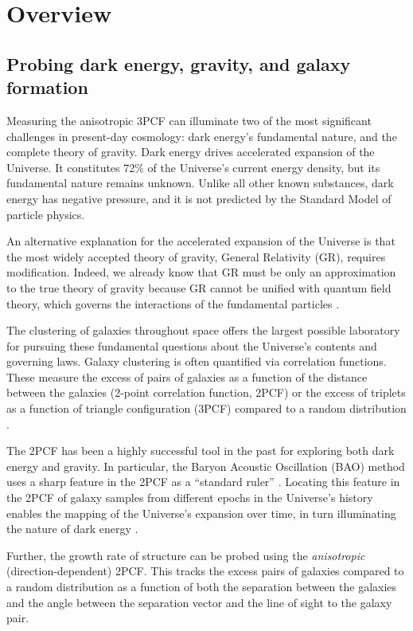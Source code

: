 \section{Overview}
\label{sec:overview}
\subsection{Probing dark energy, gravity, and galaxy formation}
Measuring the anisotropic 3PCF can illuminate two of the most significant challenges in present-day  cosmology: dark energy's fundamental nature, and the complete theory of gravity. Dark energy drives accelerated expansion of the Universe. It constitutes 72\% of the Universe's current energy density, but its fundamental nature remains unknown. Unlike all other known substances, dark energy has negative pressure, and it is not predicted by the Standard Model of particle physics.

An alternative explanation for the accelerated expansion of the Universe is that the most widely accepted theory of gravity, General Relativity (GR), requires modification. Indeed, we already know that GR must be only an approximation to the true theory of gravity because GR cannot be unified with quantum field theory, which governs the interactions of the fundamental particles \cite{Copeland}.

The clustering of galaxies throughout space offers the largest possible laboratory  for pursuing these fundamental questions about the Universe's contents and governing laws. Galaxy clustering is often quantified via correlation functions. These measure the excess of pairs of galaxies as a function of the distance between the galaxies (2-point correlation function, 2PCF) or the excess of triplets as a function of triangle configuration (3PCF) compared to a random distribution \cite{Peebles}.

The 2PCF has been a highly successful tool in the past for exploring both dark energy and gravity.  In particular, 
the Baryon Acoustic Oscillation (BAO) method uses a sharp feature in the 2PCF  as a ``standard ruler'' \cite{Eisenstein1998}. Locating this feature in the 2PCF of galaxy samples from different epochs in the Universe's history enables the mapping of the Universe's expansion over time,  in turn illuminating the nature of dark energy \cite{Weinberg,Alam2016}.

Further, the growth rate of structure can be probed using the { \it{anisotropic}} (direction-dependent) 2PCF. This tracks the excess pairs of galaxies compared to a random distribution as a function of both the separation between the galaxies and the angle between the separation vector and the line of sight to the galaxy pair. 

